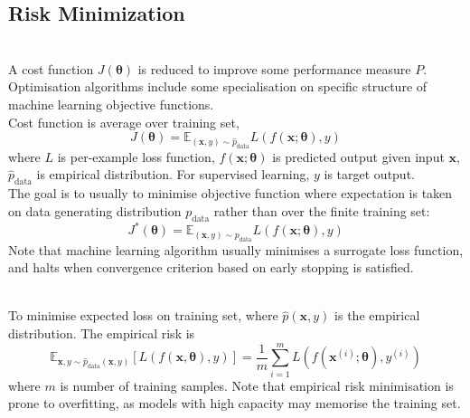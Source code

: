 \subsection{Risk Minimization}

\begin{remark} \\
A cost function $J(\bm{\theta})$ is reduced to improve some performance measure $P$.\\
Optimisation algorithms include some specialisation on specific structure of machine learning objective functions.\\
Cost function is average over training set,
\begin{equation*}
J(\bm{\theta}) = \mathbb{E}_{(\bm{x}, y) \sim \hat{p}_{\text{data}}} L(f(\bm{x}; \bm{\theta}), y) \nonumber
\end{equation*}
where $L$ is per-example loss function, $f(\bm{x}; \bm{\theta})$ is predicted output given input $\bm{x}$, $\hat{p}_{\text{data}}$ is empirical distribution. For supervised learning, $y$ is target output.\\
The goal is to usually to minimise objective function where expectation is taken on data generating distribution $p_{\text{data}}$ rather than over the finite training set:
\begin{equation*}
J^*(\bm{\theta}) = \mathbb{E}_{(\bm{x}, y) \sim p_{\text{data}}} L(f(\bm{x}; \bm{\theta}), y) \nonumber
\end{equation*}
Note that machine learning algorithm usually minimises a surrogate loss function, and halts when convergence criterion based on early  stopping is satisfied.
\end{remark}

\begin{definition} \\
To minimise expected loss on training set, where $\hat{p}(\bm{x}, y)$ is the empirical distribution. The empirical risk is
\begin{equation*}
\mathbb{E}_{\bm{x}, y \sim \hat{p}_{\text{data}}(\bm{x}, y)}[L(f(\bm{x}, \bm{\theta}), y)] = \frac{1}{m} \sum\limits_{i=1}^m L(f(\bm{x}^{(i)}; \bm{\theta}), y^{(i)}) \nonumber
\end{equation*}
where $m$ is number of training samples. Note that empirical risk minimisation is prone to overfitting, as models with high capacity may memorise the training set.
\end{definition}
